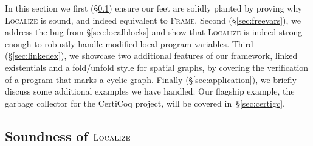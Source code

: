 In this section we first (\S\ref{sec:rulessound}) ensure our feet are solidly planted by proving why \textsc{Localize} is sound, and indeed equivalent to \textsc{Frame}.  Second (\S\ref{sec:freevars}),
we address the bug from \S\ref{sec:localblocks} and show that \textsc{Localize} is indeed
strong enough to robustly handle modified local program variables.  Third (\S\ref{sec:linkedex}),
we showcase two additional features of our framework, linked existentials and a fold/unfold style
for spatial graphs, by covering the verification of a program that marks a cyclic graph.
Finally (\S\ref{sec:application}), we briefly discuss some additional examples we have handled.
Our flagship example, the garbage collector for the CertiCoq project, will be covered in~\S\ref{sec:certigc}.





\subsection{Soundness of $\textsc{Localize}$}
\label{sec:rulessound}


